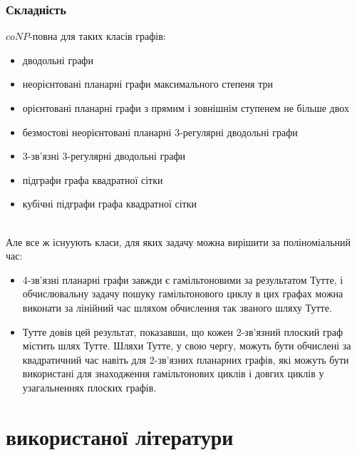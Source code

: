 \documentclass[14pt]{article}
\begin{document}
\begin{spacing}{1.175}
            \subsubsection{\normalfont Складність}

            \(coNP\)-повна для таких класів графів:
            \begin{itemize}
                \item дводольні графи
                \item неорієнтовані планарні графи максимального степеня три
                \item орієнтовані планарні графи з прямим і зовнішнім ступенем не більше двох
                \item безмостові неорієнтовані планарні 3-регулярні дводольні графи
                \item 3-зв'язні 3-регулярні дводольні графи
                \item підграфи графа квадратної сітки
                \item кубічні підграфи графа квадратної сітки
            \end{itemize}
            \\
        Але все ж існуують класи, для яких задачу можна вирішити за поліноміальний час:
            \begin{itemize}
                \item 4-зв’язні планарні графи завжди є гамільтоновими за результатом Тутте, і обчислювальну задачу пошуку гамільтонового циклу в цих графах можна виконати за лінійний час шляхом обчислення так званого шляху Тутте.
                \item Тутте довів цей результат, показавши, що кожен 2-зв’язний плоский граф містить шлях Тутте. Шляхи Тутте, у свою чергу, можуть бути обчислені за квадратичний час навіть для 2-зв’язних планарних графів, які можуть бути використані для знаходження гамільтонових циклів і довгих циклів у узагальненнях плоских графів.
            \end{itemize}
    \newpage
    \section{ використаної літератури}
    

\end{spacing}
\end{document}
